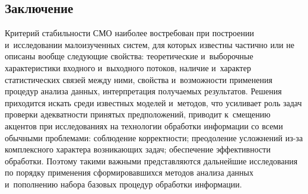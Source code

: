 \begin{multicols}{2}
     
      
\section{Заключение}

     Критерий стабильности СМО наиболее востребован при по\-стро\-ении 
и~исследовании малоизученных сис\-тем, для которых известны час\-тич\-но или не 
описаны вообще следующие свойства: тео\-ре\-ти\-че\-ские и~выборочные 
характеристики входного и~выходного потоков, наличие и~характер 
статистических связей между ними, свойства и~возможности применения 
процедур анализа данных, интерпретация по\-лу\-ча\-емых результатов. Решения 
приходится искать среди известных моделей и~методов, что усиливает роль задач 
проверки адек\-ват\-ности принятых предположений, приводит к~смещению акцентов 
при исследованиях на технологии обработки информации со всеми обычными 
проблемами: соблюдение кор\-рект\-ности; преодоление услож\-не\-ний из-за 
комплексного характера воз\-ни\-ка\-ющих задач; обеспечение эф\-фек\-тив\-ности 
обработки. Поэтому такими важными пред\-став\-ля\-ют\-ся дальнейшие исследования 
по порядку применения сформировавшихся методов анализа данных 
и~пополнению набора базовых процедур обработки информации. 


\end{multicols}
